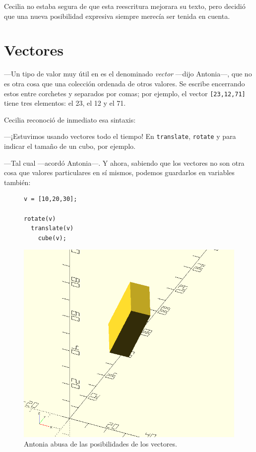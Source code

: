     Cecilia no estaba segura de que esta reescritura mejorara su
    texto, pero decidió que una nueva posibilidad expresiva siempre
    merecía ser tenida en cuenta.


  \section{Vectores}

  ---Un tipo de valor muy útil en \openscad{} es el denominado
  \emph{vector} ---dijo Antonia---, que no es otra cosa que una
  colección ordenada de otros valores. Se escribe encerrando estos
  entre corchetes y separados por comas; por ejemplo, el vector
  \lstinline![23,12,71]!  tiene tres elementos: el 23, el 12 y el 71.

  Cecilia reconoció de inmediato esa sintaxis:

  ---¡Estuvimos usando vectores todo el tiempo! En
  \lstinline!translate!, \lstinline!rotate! y para indicar el tamaño
  de un cubo, por ejemplo.

  ---Tal cual ---acordó Antonia---. Y ahora, sabiendo
    que los vectores no son otra cosa que valores particulares en sí
    mismos, podemos guardarlos en variables también:

  \begin{figure}[ht]    
  \begin{minipage}[]{.5\textwidth}
    \begin{lstlisting}
v = [10,20,30];

rotate(v)
  translate(v)
    cube(v);
\end{lstlisting}
  \end{minipage}\hfill
    \begin{minipage}[]{.5\textwidth}
      \centering
      \includegraphics[width=.8\textwidth]{imagenes/cubo-v}
    \end{minipage}
    \caption{Antonia abusa de las posibilidades de los vectores.}
      \label{fig:abuso-de-vectores}
    \end{figure}


